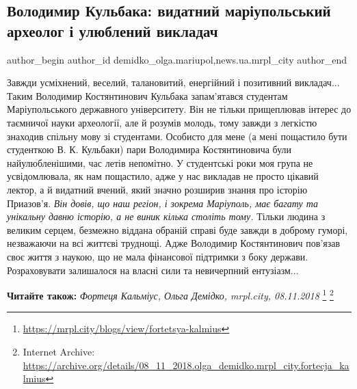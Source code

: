  
 
 
 
 
 
\subsection{Володимир Кульбака: видатний маріупольський археолог і улюблений викладач}
\label{sec:21_12_2018.stz.news.ua.mrpl_city.1.volodymyr_kulbaka}
 
\ifcmt
 author_begin
   author_id demidko_olga.mariupol,news.ua.mrpl_city
 author_end
\fi


Завжди усміхнений, веселий, талановитий, енергійний і позитивний викладач...
Таким Володимир Костянтинович Кульбака запам'ятався студентам Маріупольського
державного університету. Він не тільки прищеплював інтерес до таємничої науки
археології, але й розумів молодь, тому завжди з легкістю знаходив спільну мову
зі студентами. Особисто для мене (а мені пощастило бути студенткою В. К.
Кульбаки) пари Володимира Костянтиновича були найулюбленішими, час летів
непомітно. У студентські роки моя група не усвідомлювала, як нам пощастило,
адже у нас викладав не просто цікавий лектор, а й видатний вчений, який значно
розширив знання про історію Приазов'я. \emph{Він довів, що наш регіон, і зокрема
Маріуполь, має багату та унікальну давню історію, а не виник кілька століть
тому.} Тільки людина з великим серцем, безмежно віддана обраній справі буде
завжди в доброму гуморі, незважаючи на всі життєві труднощі. Адже Володимир
Костянтинович пов'язав своє життя з наукою, що не мала фінансової підтримки з
боку держави. Розраховувати залишалося на власні сили та невичерпний ентузіазм...

\textbf{Читайте також:} \emph{Фортеця Кальміус, Ольга Демідко, mrpl.city, 08.11.2018}%
\footnote{\url{https://mrpl.city/blogs/view/fortetsya-kalmius}} %
\footnote{Internet Archive: \url{https://archive.org/details/08_11_2018.olga_demidko.mrpl_city.fortecja_kalmius}}

